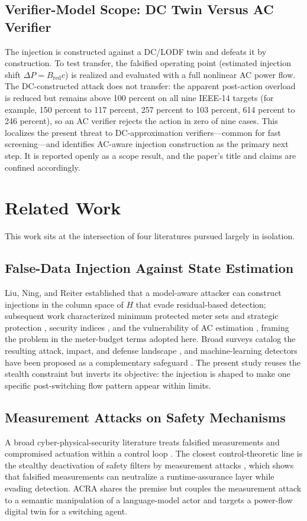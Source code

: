 \documentclass{ieeeaccess}
\begin{document}
\subsection{Verifier-Model Scope: DC Twin Versus AC Verifier}\label{sec:ac}
The injection is constructed against a DC/LODF twin and defeats it by construction. To test transfer, the falsified operating point (estimated injection shift $\Delta P = B_{\mathrm{red}}c$) is realized and evaluated with a full nonlinear AC power flow. The DC-constructed attack does not transfer: the apparent post-action overload is reduced but remains above 100 percent on all nine IEEE-14 targets (for example, 150 percent to 117 percent, 257 percent to 103 percent, 614 percent to 246 percent), so an AC verifier rejects the action in zero of nine cases. This localizes the present threat to DC-approximation verifiers---common for fast screening---and identifies AC-aware injection construction as the primary next step. It is reported openly as a scope result, and the paper's title and claims are confined accordingly.

\section{Related Work}\label{sec:related}
This work sits at the intersection of four literatures pursued largely in isolation.

\subsection{False-Data Injection Against State Estimation}
Liu, Ning, and Reiter \cite{liu} established that a model-aware attacker can construct injections in the column space of $H$ that evade residual-based detection; subsequent work characterized minimum protected meter sets and strategic protection \cite{dan,kim}, security indices \cite{sandbergindices}, and the vulnerability of AC estimation \cite{huggiampapa,kosut}, framing the problem in the meter-budget terms adopted here. Broad surveys catalog the resulting attack, impact, and defense landscape \cite{liangreview,dengsurvey}, and machine-learning detectors have been proposed as a complementary safeguard \cite{ozay}. The present study reuses the stealth constraint but inverts its objective: the injection is shaped to make one specific post-switching flow pattern appear within limits.

\subsection{Measurement Attacks on Safety Mechanisms}
A broad cyber-physical-security literature treats falsified measurements and compromised actuation within a control loop \cite{cardenas,mo,teixeira}. The closest control-theoretic line is the stealthy deactivation of safety filters by measurement attacks \cite{arnstrom,arnstrom2}, which shows that falsified measurements can neutralize a runtime-assurance layer while evading detection. ACRA shares the premise but couples the measurement attack to a semantic manipulation of a language-model actor and targets a power-flow digital twin for a switching agent.
\end{document}
